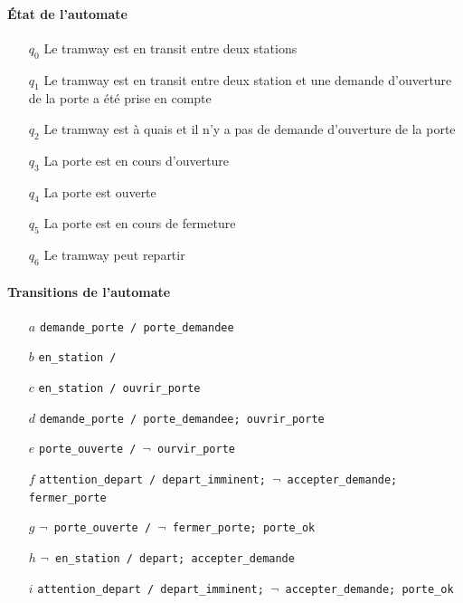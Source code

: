 \documentclass{article}
\begin{document}
      \paragraph{État de l'automate}
        \begin{itemize}
          \item[$q_0$] Le tramway est en transit entre deux stations
          \item[$q_1$] Le tramway est en transit entre deux station et une
            demande d'ouverture de la porte a été prise en compte
          \item[$q_2$] Le tramway est à quais et il n'y a pas de demande
            d'ouverture de la porte
          \item[$q_3$] La porte est en cours d'ouverture
          \item[$q_4$] La porte est ouverte
          \item[$q_5$] La porte est en cours de fermeture
          \item[$q_6$] Le tramway peut repartir
        \end{itemize}

      \paragraph{Transitions de l'automate}
        \begin{itemize}
          \item[$a$] {\tt demande\_porte / porte\_demandee}
          \item[$b$] {\tt en\_station /}
          \item[$c$] {\tt en\_station / ouvrir\_porte}
          \item[$d$] {\tt demande\_porte / porte\_demandee; ouvrir\_porte}
          \item[$e$] {\tt porte\_ouverte / $\lnot$ ourvir\_porte}
          \item[$f$] {\tt attention\_depart / depart\_imminent; $\lnot$
            accepter\_demande; fermer\_porte}
          \item[$g$] {\tt $\lnot$ porte\_ouverte / $\lnot$ fermer\_porte; porte\_ok}
          \item[$h$] {\tt $\lnot$ en\_station / depart; accepter\_demande}
          \item[$i$] {\tt attention\_depart / depart\_imminent; $\lnot$
            accepter\_demande; porte\_ok}
        \end{itemize}
\end{document}
